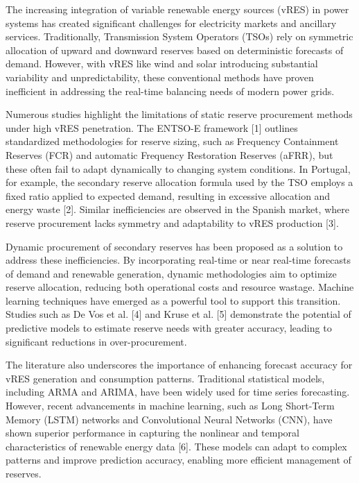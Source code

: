 The increasing integration of variable renewable energy sources (vRES) in power systems has created significant challenges for electricity markets and ancillary services. Traditionally, Transmission System Operators (TSOs) rely on symmetric allocation of upward and downward reserves based on deterministic forecasts of demand. However, with vRES like wind and solar introducing substantial variability and unpredictability, these conventional methods have proven inefficient in addressing the real-time balancing needs of modern power grids.\par
Numerous studies highlight the limitations of static reserve procurement methods under high vRES penetration. The ENTSO-E framework [1] outlines standardized methodologies for reserve sizing, such as Frequency Containment Reserves (FCR) and automatic Frequency Restoration Reserves (aFRR), but these often fail to adapt dynamically to changing system conditions. In Portugal, for example, the secondary reserve allocation formula used by the TSO employs a fixed ratio applied to expected demand, resulting in excessive allocation and energy waste [2]. Similar inefficiencies are observed in the Spanish market, where reserve procurement lacks symmetry and adaptability to vRES production [3].\par
Dynamic procurement of secondary reserves has been proposed as a solution to address these inefficiencies. By incorporating real-time or near real-time forecasts of demand and renewable generation, dynamic methodologies aim to optimize reserve allocation, reducing both operational costs and resource wastage. Machine learning techniques have emerged as a powerful tool to support this transition. Studies such as De Vos et al. [4] and Kruse et al. [5] demonstrate the potential of predictive models to estimate reserve needs with greater accuracy, leading to significant reductions in over-procurement.\par
The literature also underscores the importance of enhancing forecast accuracy for vRES generation and consumption patterns. Traditional statistical models, including ARMA and ARIMA, have been widely used for time series forecasting. However, recent advancements in machine learning, such as Long Short-Term Memory (LSTM) networks and Convolutional Neural Networks (CNN), have shown superior performance in capturing the nonlinear and temporal characteristics of renewable energy data [6]. These models can adapt to complex patterns and improve prediction accuracy, enabling more efficient management of reserves.\par
